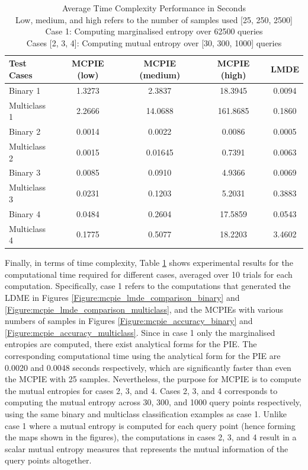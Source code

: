 		\begin{table}[h]
			\begin{center}
				\begin{tabular}{ l c c c c }
					\hline
					\hline
					Test Cases & MCPIE (low) & MCPIE (medium) & MCPIE (high) & LMDE \\
					\hline
					\hline
					Binary 1 & 1.3273 & 2.3837 & 18.3945 & 0.0094 \\
					Multiclass 1 & 2.2666 & 14.0688 & 161.8685 & 0.1860 \\
					Binary 2 & 0.0014 & 0.0022 & 0.0086 & 0.0005 \\
					Multiclass 2 & 0.0015 & 0.01645 & 0.7391 & 0.0063 \\
					Binary 3 & 0.0085 & 0.0910 & 4.9366 & 0.0069 \\
					Multiclass 3 & 0.0231 & 0.1203 & 5.2031 & 0.3883 \\
					Binary 4 & 0.0484 & 0.2604 & 17.5859 & 0.0543 \\
					Multiclass 4 & 0.1775 & 0.5077 & 18.2203 & 3.4602 \\
					\hline
					\hline
				\end{tabular}
			\end{center}
	  	\caption{Average Time Complexity Performance in Seconds \\ Low, medium, and high refers to the number of samples used [25, 250, 2500] \\ Case 1: Computing marginalised entropy over 62500 queries \\ Cases [2, 3, 4]: Computing mutual entropy over [30, 300, 1000] queries}
	  	\label{Table:TimeComplexity}			
	  	\end{table}	
	  	
		Finally, in terms of time complexity, Table \ref{Table:TimeComplexity} shows experimental results for the computational time required for different cases, averaged over 10 trials for each computation. Specifically, case 1 refers to the computations that generated the LDME in Figures \ref{Figure:mcpie_lmde_comparison_binary} and \ref{Figure:mcpie_lmde_comparison_multiclass}, and the MCPIEs with various numbers of samples in Figures \ref{Figure:mcpie_accuracy_binary} and \ref{Figure:mcpie_accuracy_multiclass}. Since in case 1 only the marginalised entropies are computed, there exist analytical forms for the PIE. The corresponding computational time using the analytical form for the PIE are 0.0020 and 0.0048 seconds respectively, which are significantly faster than even the MCPIE with 25 samples. Nevertheless, the purpose for MCPIE is to compute the mutual entropies for cases 2, 3, and 4. Cases 2, 3, and 4 corresponds to computing the mutual entropy across 30, 300, and 1000 query points respectively, using the same binary and multiclass classification examples as case 1. Unlike case 1 where a mutual entropy is computed for each query point (hence forming the maps shown in the figures), the computations in cases 2, 3, and 4 result in a scalar mutual entropy measures that represents the mutual information of the query points altogether.
		

